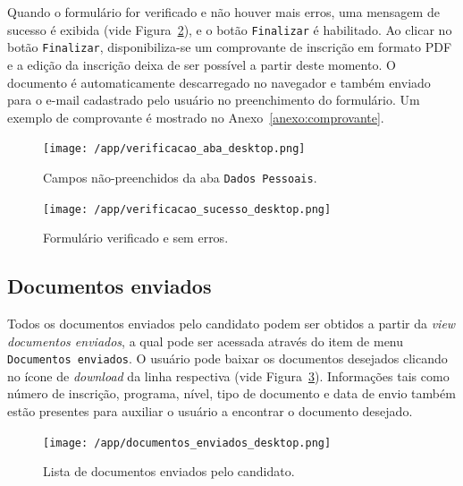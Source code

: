 \documentclass[
  10.5pt,				  %
	openright,			%
	twoside,			  %
  a5paper,
  chapter=TITLE,	%
	section=TITLE,	%
  hyphens,        %
	english,        %
	brazil          %
]{abntex2}
\begin{document}
Quando o formulário for verificado e não houver mais erros, uma mensagem de sucesso é exibida (vide Figura~\ref{fig:verificacao_sucesso}), e o botão \texttt{Finalizar} é habilitado. Ao clicar no botão \texttt{Finalizar}, disponibiliza-se um comprovante de inscrição em formato PDF e a edição da inscrição deixa de ser possível a partir deste momento. O documento é automaticamente descarregado no navegador e também enviado para o e-mail cadastrado pelo usuário no preenchimento do formulário. Um exemplo de comprovante é mostrado no Anexo~\ref{anexo:comprovante}.

\begin{figure}[!ht]
  \caption{\label{fig:verificacao_aba} Campos não-preenchidos da aba \texttt{Dados Pessoais}.}
  \begin{center}
    \texttt{[image: /app/verificacao\_aba\_desktop.png]}
  \end{center}
\end{figure}


\begin{figure}[!ht]
  \caption{\label{fig:verificacao_sucesso} Formulário verificado e sem erros.}
  \begin{center}
    \texttt{[image: /app/verificacao\_sucesso\_desktop.png]}
  \end{center}
\end{figure}

\subsection{Documentos enviados}\label{sec:documentos_enviados}

Todos os documentos enviados pelo candidato podem ser obtidos a partir da \emph{view documentos enviados}, a qual pode ser acessada através do item de menu \texttt{Documentos enviados}. O usuário pode baixar os documentos desejados clicando no ícone de \emph{download} da linha respectiva (vide Figura~\ref{fig:documentos_enviados}). Informações tais como número de inscrição, programa, nível, tipo de documento e data de envio também estão presentes para auxiliar o usuário a encontrar o documento desejado.


\begin{figure}[!ht]
  \caption{\label{fig:documentos_enviados} Lista de documentos enviados pelo candidato.}
  \begin{center}
    \texttt{[image: /app/documentos\_enviados\_desktop.png]}
  \end{center}
\end{figure}
\end{document}
